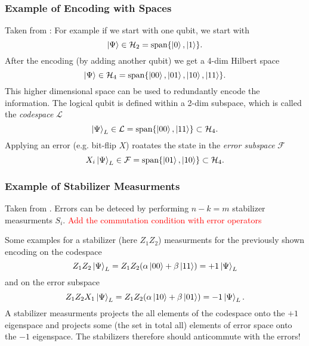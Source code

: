 \subsubsection{Example of Encoding with Spaces}
Taken from \cite{QECintro}: 
For example if we start with one qubit, we start with 
\begin{equation}
    \ket{\Psi} \in \mathcal{H}_2 = \text{span}\{\ket{0},\ket{1} \}.
\end{equation}
After the encoding (by adding another qubit) we get a 4-dim Hilbert space 
\begin{equation}
    \ket{\Psi} \in \mathcal{H}_4 = \text{span}\{\ket{00},\ket{01},\ket{10},\ket{11} \}.
\end{equation}
This higher dimensional space can be used to redundantly encode the information.
The logical qubit is defined within a 2-dim subspace, which is called the \textit{codespace} $\mathcal{L}$
\begin{equation}
    \ket{\Psi}_L \in \mathcal{L} = \text{span}\{\ket{00},\ket{11} \} \subset \mathcal{H}_4.
\end{equation}
Applying an error (e.g. bit-flip $X$) roatates the state in the \textit{error subspace} $\mathcal{F}$
\begin{equation}
    X_i \ket{\Psi}_L \in \mathcal{F} = \text{span}\{\ket{01},\ket{10} \} \subset \mathcal{H}_4.
\end{equation} 


\subsubsection{Example of Stabilizer Measurments}
Taken from \cite{QECintro}.
Errors can be deteced by performing $n-k=m$ stabilizer measurments $S_i$.
\textcolor{red}{Add the commutation condition with error operators}

Some examples for a stabilizer (here $Z_1 Z_2$) measurments for the previously shown encoding on the codespace
\begin{equation}
    Z_1 Z_2 \ket{\Psi}_L = Z_1 Z_2 (\alpha \ket{00}+ \beta \ket{11}) = +1 \ket{\Psi}_L
\end{equation}
and on the error subspace
\begin{equation}
    Z_1 Z_2 X_1\ket{\Psi}_L = Z_1 Z_2 (\alpha \ket{10}+ \beta \ket{01}) = -1 \ket{\Psi}_L.
\end{equation}
A stabilizer measurments projects the all elements of the codespace onto the $+1$ eigenspace 
and projects some (the set in total all) elements of error space onto the $-1$ eigenspace. 
The stabilizers therefore should anticommute with the errors! 


